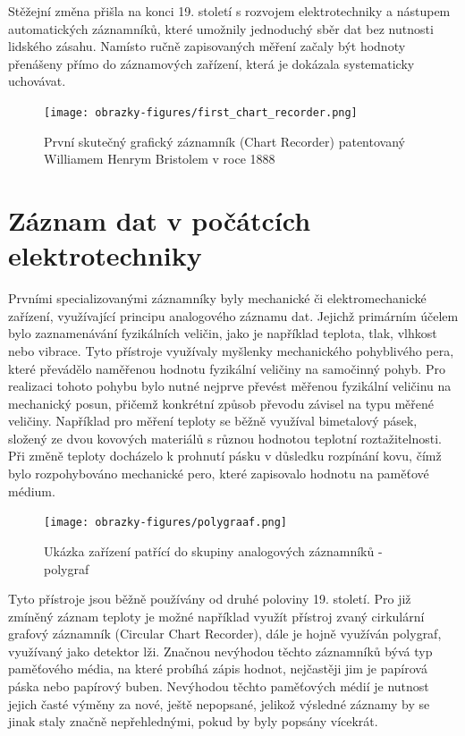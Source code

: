 Stěžejní změna přišla na konci 19. století s rozvojem elektrotechniky a nástupem automatických záznamníků, které umožnily jednoduchý sběr dat bez nutnosti lidského zásahu. Namísto ručně zapisovaných měření začaly být hodnoty přenášeny přímo do záznamových zařízení, která je dokázala systematicky uchovávat. \cite{origin_of_chart_recorders}

\begin{figure}[h] %
    \centering
    \texttt{[image: obrazky-figures/first\_chart\_recorder.png]}
    \caption{První skutečný grafický záznamník (Chart Recorder) patentovaný Williamem Henrym Bristolem v roce 1888 \cite{bristol_chart_recorders}}
    \label{fig:chart_recorder}  
\end{figure}

\section{Záznam dat v počátcích elektrotechniky}
\label{zaznam}
Prvními specializovanými záznamníky byly mechanické či elektromechanické zařízení, využívající principu analogového záznamu dat. Jejichž primárním účelem bylo zaznamenávání fyzikálních veličin, jako je například teplota, tlak, vlhkost nebo vibrace. Tyto přístroje využívaly myšlenky mechanického pohyblivého pera, které převádělo naměřenou hodnotu fyzikální veličiny na samočinný pohyb. Pro realizaci tohoto pohybu bylo nutné nejprve převést měřenou fyzikální veličinu na mechanický posun, přičemž konkrétní způsob převodu závisel na typu měřené veličiny. Například pro měření teploty se běžně využíval bimetalový pásek, složený ze dvou kovových materiálů s různou hodnotou teplotní roztažitelnosti. Při změně teploty docházelo k prohnutí pásku v důsledku rozpínání kovu, čímž bylo rozpohybováno mechanické pero, které zapisovalo hodnotu na paměťové médium. 


\begin{figure}[h] %
    \centering
    \texttt{[image: obrazky-figures/polygraaf.png]}
    \caption{Ukázka zařízení patřící do skupiny analogových záznamníků - polygraf \cite{polygraph_picture}}
    \label{fig:polygraaf}
\end{figure}


Tyto přístroje jsou běžně používány od druhé poloviny 19. století. Pro již zmíněný záznam teploty je možné například využít přístroj zvaný cirkulární grafový záznamník (Circular Chart Recorder), dále je hojně využíván polygraf, využívaný jako detektor lži. Značnou nevýhodou těchto záznamníků bývá typ paměťového média, na které probíhá zápis hodnot, nejčastěji jim je papírová páska nebo papírový buben. Nevýhodou těchto paměťových médií je nutnost jejich časté výměny za nové, ještě nepopsané, jelikož výsledné záznamy by se jinak staly značně nepřehlednými, pokud by byly popsány vícekrát. \cite{origin_of_chart_recorders}

